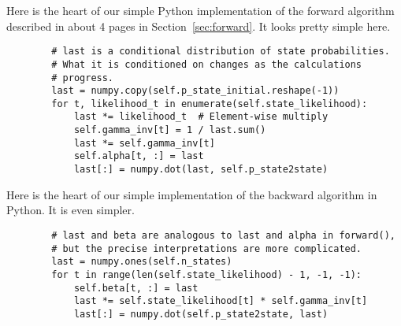 Here is the heart of our simple Python implementation of the forward
algorithm described in about 4 pages in Section~\ref{sec:forward}.  It
looks pretty simple here.
\label{code:forward}
\begin{verbatim}
        # last is a conditional distribution of state probabilities.
        # What it is conditioned on changes as the calculations
        # progress.
        last = numpy.copy(self.p_state_initial.reshape(-1))
        for t, likelihood_t in enumerate(self.state_likelihood):
            last *= likelihood_t  # Element-wise multiply
            self.gamma_inv[t] = 1 / last.sum()
            last *= self.gamma_inv[t]
            self.alpha[t, :] = last
            last[:] = numpy.dot(last, self.p_state2state)
\end{verbatim}


Here is the heart of our simple implementation of the backward
algorithm in Python.  It is even simpler.
\label{code:backward}
\begin{verbatim}
        # last and beta are analogous to last and alpha in forward(),
        # but the precise interpretations are more complicated.
        last = numpy.ones(self.n_states)
        for t in range(len(self.state_likelihood) - 1, -1, -1):
            self.beta[t, :] = last
            last *= self.state_likelihood[t] * self.gamma_inv[t]
            last[:] = numpy.dot(self.p_state2state, last)
\end{verbatim}


